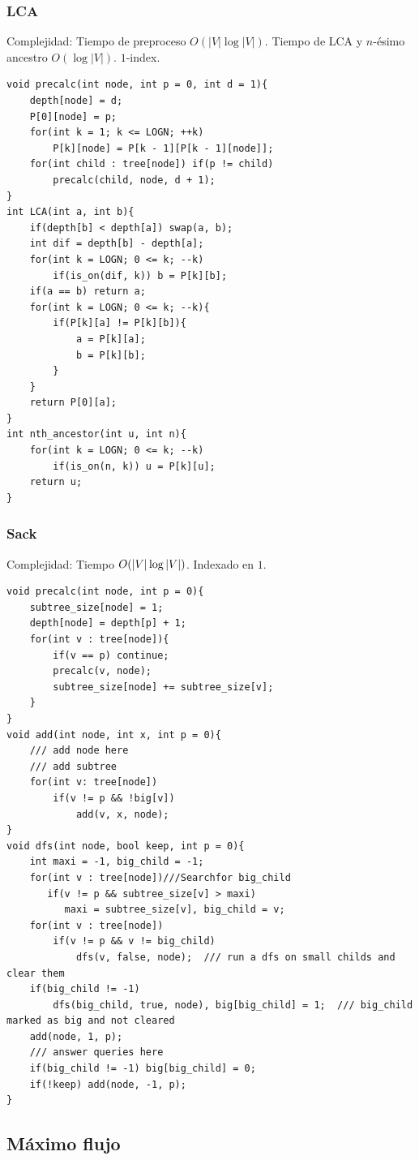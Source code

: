 \documentclass[12 pts,spanish,mexico]{article}
\numberwithin{equation}{section}
\begin{document}
\begin{multicols}{2}
\subsubsection{LCA}
Complejidad: Tiempo de preproceso $O(|V|\log |V|)$. Tiempo de LCA y $n$-ésimo ancestro $O(\log |V|)$. $1$-index.
\begin{verbatim}
void precalc(int node, int p = 0, int d = 1){
    depth[node] = d;
    P[0][node] = p;
    for(int k = 1; k <= LOGN; ++k)
        P[k][node] = P[k - 1][P[k - 1][node]];
    for(int child : tree[node]) if(p != child)
        precalc(child, node, d + 1);
}
int LCA(int a, int b){
    if(depth[b] < depth[a]) swap(a, b);
    int dif = depth[b] - depth[a];
    for(int k = LOGN; 0 <= k; --k)
        if(is_on(dif, k)) b = P[k][b];
    if(a == b) return a;
    for(int k = LOGN; 0 <= k; --k){
        if(P[k][a] != P[k][b]){
            a = P[k][a];
            b = P[k][b];
        }
    }
    return P[0][a];
}
int nth_ancestor(int u, int n){
    for(int k = LOGN; 0 <= k; --k)
        if(is_on(n, k)) u = P[k][u];
    return u;
}
\end{verbatim}

\subsubsection{Sack}
Complejidad: Tiempo $O(\abs{V}\log \abs{V})$. Indexado en $1$.
\begin{verbatim}
void precalc(int node, int p = 0){
    subtree_size[node] = 1;
    depth[node] = depth[p] + 1;
    for(int v : tree[node]){
        if(v == p) continue;
        precalc(v, node);
        subtree_size[node] += subtree_size[v];
    }
}
void add(int node, int x, int p = 0){
    /// add node here
    /// add subtree
    for(int v: tree[node])
        if(v != p && !big[v])
            add(v, x, node);
}
void dfs(int node, bool keep, int p = 0){
    int maxi = -1, big_child = -1;
    for(int v : tree[node])///Searchfor big_child
       if(v != p && subtree_size[v] > maxi)
          maxi = subtree_size[v], big_child = v;
    for(int v : tree[node])
        if(v != p && v != big_child)
            dfs(v, false, node);  /// run a dfs on small childs and clear them
    if(big_child != -1)
        dfs(big_child, true, node), big[big_child] = 1;  /// big_child marked as big and not cleared
    add(node, 1, p);
    /// answer queries here
    if(big_child != -1) big[big_child] = 0;
    if(!keep) add(node, -1, p);
}
\end{verbatim}

\subsection{Máximo flujo}


\end{multicols}
\end{document}
